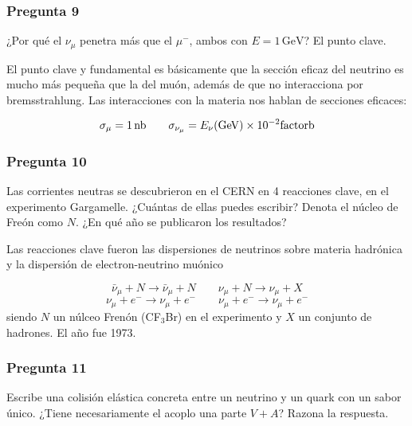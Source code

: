\vspace*{2em}

\begin{Enunciado}
	\subsubsection*{Pregunta 9}

	¿Por qué el $\nu_\mu$ penetra más que el $\mu^-$, ambos con $E = 1\,\mathrm{GeV}$? El punto clave.

\end{Enunciado}

El punto clave y fundamental es básicamente que la sección eficaz del neutrino es mucho más pequeña que la del muón, además de que no interacciona por bremsstrahlung. Las interacciones con la materia nos hablan de secciones eficaces:

\begin{equation}
	\sigma_{\mu} = \SI{1}{nb} \qquad \sigma_{\nu_{\mu}} = {E_{\nu}(\text{GeV})} \times 10^{-2}  \SI{}{factorb}
\end{equation}
\vspace*{2em}

\begin{Enunciado}
	\subsubsection*{Pregunta 10}

	Las corrientes neutras se descubrieron en el CERN en 4 reacciones clave, en el experimento Gargamelle. ¿Cuántas de ellas puedes escribir? Denota el núcleo de Freón como $N$. ¿En qué año se publicaron los resultados?

\end{Enunciado}

Las reacciones clave fueron las dispersiones de neutrinos sobre materia hadrónica y la dispersión de electron-neutrino muónico

\begin{equation}
	\bar{\nu}_\mu + N \rightarrow  \bar{\nu}_\mu + N  \qquad
	{\nu}_\mu + N \rightarrow   {\nu}_\mu + X
\end{equation}
\begin{equation}
	{\nu}_\mu + e^- \rightarrow   {\nu}_\mu + e^- \qquad
	{\nu}_\mu + e^- \rightarrow   {\nu}_\mu + e^-
\end{equation}
siendo $N$ un núlceo Frenón  (CF$_3$Br) en el experimento y $X$ un conjunto de hadrones. El año fue 1973.

\vspace*{2em}
\begin{Enunciado}
	\subsubsection*{Pregunta 11}

	Escribe una colisión elástica concreta entre un neutrino y un quark con un sabor único. ¿Tiene necesariamente el acoplo una parte $V + A$? Razona la respuesta.

\end{Enunciado}

